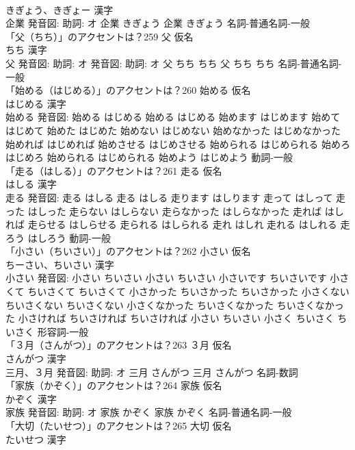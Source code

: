 \documentclass[8pt]{extreport}
\begin{document}
\begin{CJK}{UTF8}{min}
\\	きぎょう、きぎょー 漢字　
\\	企業 発音図: 助詞: オ	企業 きぎょう		企業 きぎょう				名詞-普通名詞-一般 
\\	「父（ちち）」のアクセントは？259	父 仮名　
\\	ちち 漢字　
\\	父 発音図: 助詞: オ 発音図: 助詞: オ	父 ちち ちち		父 ちち ちち				名詞-普通名詞-一般 
\\	「始める（はじめる）」のアクセントは？260	始める 仮名　
\\	はじめる 漢字　
\\	始める 発音図:	始める はじめる		始める はじめる 始めます はじめます 始めて はじめて 始めた はじめた 始めない はじめない 始めなかった はじめなかった 始めれば はじめれば 始めさせる はじめさせる 始められる はじめられる 始めろ はじめろ 始められる はじめられる 始めよう はじめよう				動詞-一般 
\\	「走る（はしる）」のアクセントは？261	走る 仮名　
\\	はしる 漢字　
\\	走る 発音図:	走る はしる		走る はしる 走ります はしります 走って はしって 走った はしった 走らない はしらない 走らなかった はしらなかった 走れば はしれば 走らせる はしらせる 走られる はしられる 走れ はしれ 走れる はしれる 走ろう はしろう				動詞-一般 
\\	「小さい（ちいさい）」のアクセントは？262	小さい 仮名　
\\	ちーさい、ちいさい 漢字　
\\	小さい 発音図:	小さい ちいさい		小さい ちいさい 小さいです ちいさいです 小さくて ちいさくて ちいさくて 小さかった ちいさかった ちいさかった 小さくない ちいさくない ちいさくない 小さくなかった ちいさくなかった ちいさくなかった 小さければ ちいさければ ちいさければ 小さい ちいさい 小さく ちいさく ちいさく				形容詞-一般 
\\	「３月（さんがつ）」のアクセントは？263	３月 仮名　
\\	さんがつ 漢字　
\\	三月、３月 発音図: 助詞: オ	三月 さんがつ		三月 さんがつ				名詞-数詞 
\\	「家族（かぞく）」のアクセントは？264	家族 仮名　
\\	かぞく 漢字　
\\	家族 発音図: 助詞: オ	家族 かぞく		家族 かぞく				名詞-普通名詞-一般 
\\	「大切（たいせつ）」のアクセントは？265	大切 仮名　
\\	たいせつ 漢字　

\end{CJK}
\end{document}
